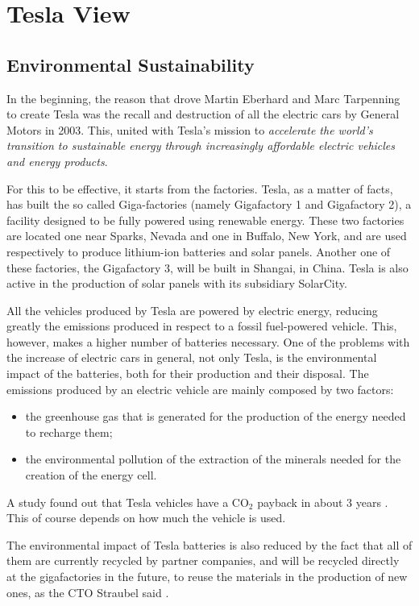 \section{Tesla View}

\subsection{Environmental Sustainability}
In the beginning, the reason that drove Martin Eberhard and Marc Tarpenning to create Tesla was the recall and destruction of all the electric cars by General Motors\cite{muskGM} in 2003. This, united with Tesla's mission to \emph{accelerate the world’s transition to sustainable energy through increasingly affordable electric vehicles and energy products}\cite{aboutTesla}.

For this to be effective, it starts from the factories. Tesla, as a matter of facts, has built the so called Giga-factories (namely Gigafactory 1 and Gigafactory 2), a facility designed to be fully powered using renewable energy. These two factories are located one near Sparks, Nevada and one in Buffalo, New York, and are used respectively to produce lithium-ion batteries and solar panels.
Another one of these factories, the Gigafactory 3, will be built in Shangai, in China. 
Tesla is also active in the production of solar panels with its subsidiary SolarCity.

All the vehicles produced by Tesla are powered by electric energy, reducing greatly the emissions produced in respect to a fossil fuel-powered vehicle. This, however, makes a higher number of batteries necessary. 
One of the problems with the increase of electric cars in general, not only Tesla, is the environmental impact of the batteries, both for their production and their disposal. 
The emissions produced by an electric vehicle are mainly composed by two factors:
\begin{itemize}
    \item the greenhouse gas that is generated for the production of the energy needed to recharge them;
    \item the environmental pollution of the extraction of the minerals needed for the creation of the energy cell\cite{scheele2016cobalt}.
\end{itemize}
 A study found out that Tesla vehicles have a CO$_2$ payback in about 3 years \cite{electricStudy}. This of course depends on how much the vehicle is used. 

The environmental impact of Tesla batteries is also reduced by the fact that all of them are currently recycled by partner companies, and will be recycled directly at the gigafactories in the future, to reuse the materials in the production of new ones, as the CTO Straubel said \cite{recycleBattery}.

